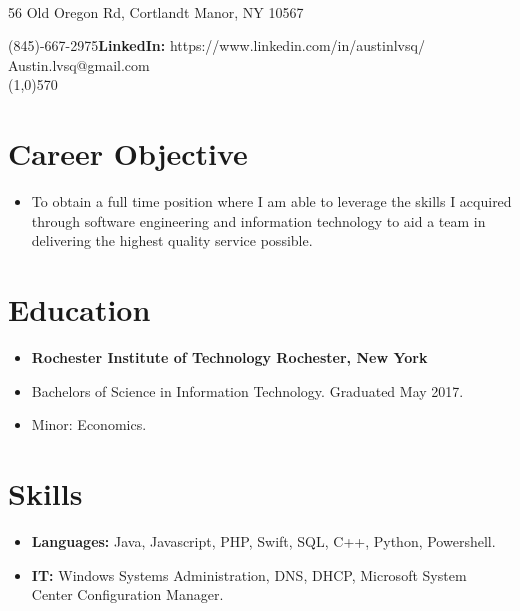 \documentclass[10pt]{Article}
\begin{document}
\begin{center}
\\
\vspace{.5ex}
56 Old Oregon Rd, Cortlandt Manor, NY 10567
\end{center}
 (845)-667-2975\hfill{\bf LinkedIn:} https://www.linkedin.com/in/austinlvsq/\\
 Austin.lvsq@gmail.com\\
\line(1,0){570}

\section*{Career Objective}
\begin{itemize}[topsep=1ex, itemsep=.5ex, parsep=0ex, partopsep=.75ex]
	\item[]To obtain a full time position where I am able to leverage the skills I acquired through software engineering and information technology to aid a team in delivering the highest quality service possible.
\end{itemize}

\section*{Education}
\begin{itemize}[topsep=1ex, itemsep=.5ex, parsep=0ex, partopsep=.75ex]
	\item[]{{\bf Rochester Institute of Technology \hfill Rochester, New York}}
  \item[] Bachelors of Science in Information Technology. \hfill Graduated May 2017.
  \item[] Minor: Economics.
\end{itemize}

\section*{Skills}
\begin{itemize}[topsep=1ex, itemsep=.5ex, parsep=0ex, partopsep=.75ex]
	\item[]{\bf Languages:} Java, Javascript, PHP, Swift, SQL, C++, Python, Powershell.
	\item[]{\bf IT:} Windows Systems Administration, DNS, DHCP, Microsoft System Center Configuration Manager.
\end{itemize}
\end{document}
